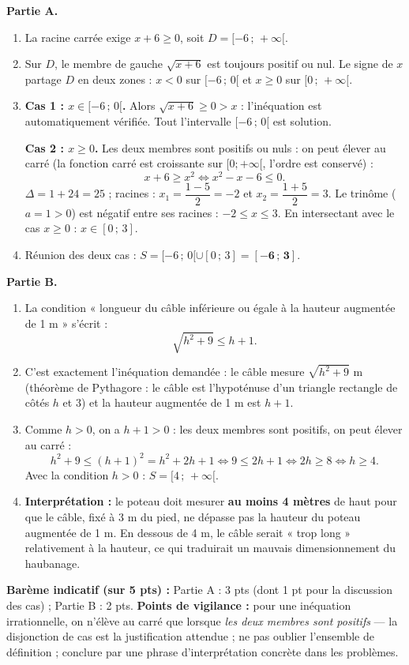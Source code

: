 \documentclass[11pt]{article}
\begin{document}
\begin{corrige}
\textbf{Partie A.}
\begin{enumerate}
    \item La racine carrée exige $x + 6 \ge 0$, soit $D = [-6\,;\,+\infty[$.
    \item Sur $D$, le membre de gauche $\sqrt{x+6}$ est toujours positif ou nul. Le signe de $x$ partage $D$ en deux zones : $x < 0$ sur $[-6\,;\,0[$ et $x \ge 0$ sur $[0\,;\,+\infty[$.
    \item \textbf{Cas 1 : $x \in [-6\,;\,0[$.} Alors $\sqrt{x+6} \ge 0 > x$ : l'inéquation est automatiquement vérifiée. Tout l'intervalle $[-6\,;\,0[$ est solution.

    \textbf{Cas 2 : $x \ge 0$.} Les deux membres sont positifs ou nuls : on peut élever au carré (la fonction carré est croissante sur $[0;+\infty[$, l'ordre est conservé) :
    \[ x + 6 \ge x^2 \iff x^2 - x - 6 \le 0. \]
    $\Delta = 1 + 24 = 25$ ; racines : $x_1 = \dfrac{1-5}{2} = -2$ et $x_2 = \dfrac{1+5}{2} = 3$. Le trinôme ($a = 1 > 0$) est négatif entre ses racines : $-2 \le x \le 3$. En intersectant avec le cas $x \ge 0$ : $x \in [0\,;\,3]$.
    \item Réunion des deux cas : $S = [-6\,;\,0[ \cup [0\,;\,3] = \mathbf{[-6\,;\,3]}$.
\end{enumerate}
\textbf{Partie B.}
\begin{enumerate}
    \item La condition « longueur du câble inférieure ou égale à la hauteur augmentée de 1 m » s'écrit :
    \[ \sqrt{h^2 + 9} \le h + 1. \]
    \item C'est exactement l'inéquation demandée : le câble mesure $\sqrt{h^2+9}$ m (théorème de Pythagore : le câble est l'hypoténuse d'un triangle rectangle de côtés $h$ et $3$) et la hauteur augmentée de 1 m est $h + 1$.
    \item Comme $h > 0$, on a $h + 1 > 0$ : les deux membres sont positifs, on peut élever au carré :
    \[ h^2 + 9 \le (h+1)^2 = h^2 + 2h + 1 \iff 9 \le 2h + 1 \iff 2h \ge 8 \iff h \ge 4. \]
    Avec la condition $h > 0$ : $S = [4\,;\,+\infty[$.
    \item \textbf{Interprétation :} le poteau doit mesurer \textbf{au moins 4 mètres} de haut pour que le câble, fixé à 3 m du pied, ne dépasse pas la hauteur du poteau augmentée de 1 m. En dessous de 4 m, le câble serait « trop long » relativement à la hauteur, ce qui traduirait un mauvais dimensionnement du haubanage.
\end{enumerate}
\textbf{Barème indicatif (sur 5 pts) :} Partie A : 3 pts (dont 1 pt pour la discussion des cas) ; Partie B : 2 pts.
\textbf{Points de vigilance :} pour une inéquation irrationnelle, on n'élève au carré que lorsque \emph{les deux membres sont positifs} — la disjonction de cas est la justification attendue ; ne pas oublier l'ensemble de définition ; conclure par une phrase d'interprétation concrète dans les problèmes.
\end{corrige}
\end{document}
